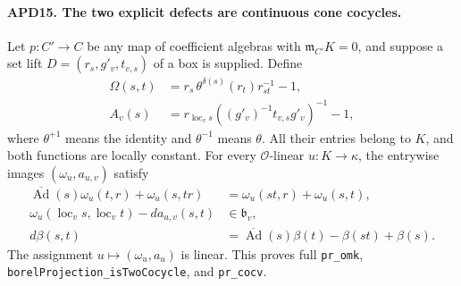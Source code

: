 \paragraph{APD15. The two explicit defects are continuous cone cocycles.}
\label{claim:APD15}
Let \(p:C'\to C\) be any map of coefficient algebras with
\(\mathfrak m_{C'}K=0\), and suppose a set lift
\(D=(r_s,g'_v,t_{v,s})\) of a box is supplied.  Define
\[
 \begin{split}
 \Omega(s,t)&=r_s\,\theta^{\delta(s)}(r_t)r_{st}^{-1}-1,\\
 A_v(s)&=r_{\operatorname{loc}_v s}
               ((g'_v)^{-1}t_{v,s}g'_v)^{-1}-1,
 \end{split}                                                  \tag{APD.26}
\]
where \(\theta^{+1}\) means the identity and
\(\theta^{-1}\) means \(\theta\).  All their entries belong
to \(K\), and both functions are locally constant.  For every
\(\mathcal O\)-linear \(u:K\to\kappa\), the entrywise
images \((\omega_u,a_{u,v})\) satisfy
\[
 \begin{split}
 \overline{\operatorname{Ad}}(s)\omega_u(t,r)+\omega_u(s,tr)
                 &=\omega_u(st,r)+\omega_u(s,t),\\
 \omega_u(\operatorname{loc}_v s,\operatorname{loc}_v t)
      -d a_{u,v}(s,t)&\in\mathfrak b_v,\\
 d\beta(s,t)&=\overline{\operatorname{Ad}}(s)\beta(t)
                                  -\beta(st)+\beta(s).
 \end{split}                                                  \tag{APD.27}
\]
The assignment \(u\mapsto(\omega_u,a_u)\) is linear.
This proves full \texttt{pr\_omk},
\texttt{borelProjection\_\allowbreak isTwoCocycle}, and \texttt{pr\_cocv}.


